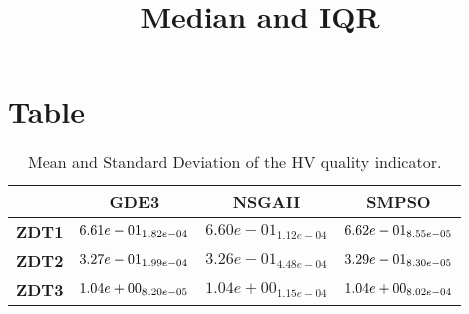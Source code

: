 \documentclass{article}
\title{Median and IQR}
\author{}
\begin{document}
\maketitle
\section{Table}
\begin{table}[!htp]
  \caption{Mean and Standard Deviation of the HV quality indicator.}
  \label{table:HV}
  \centering
  \begin{scriptsize}
  \begin{tabular}{c|ccc}
      & \textbf{GDE3} & \textbf{NSGAII} & \textbf{SMPSO} \\\hline
      \textbf{ZDT1} & $\cellcolor{gray25} 6.61e-01_{1.82e-04} $ & $ 6.60e-01_{1.12e-04} $ & $ \cellcolor{gray95} 6.62e-01_{8.55e-05}$ \\
      \textbf{ZDT2} & $\cellcolor{gray25} 3.27e-01_{1.99e-04} $ & $ 3.26e-01_{4.48e-04} $ & $ \cellcolor{gray95} 3.29e-01_{8.30e-05}$ \\
      \textbf{ZDT3} & $\cellcolor{gray95} 1.04e+00_{8.20e-05} $ & $ 1.04e+00_{1.15e-04} $ & $ \cellcolor{gray25} 1.04e+00_{8.02e-04}$ \\
  \end{tabular}
  \end{scriptsize}
\end{table}
\end{document}

